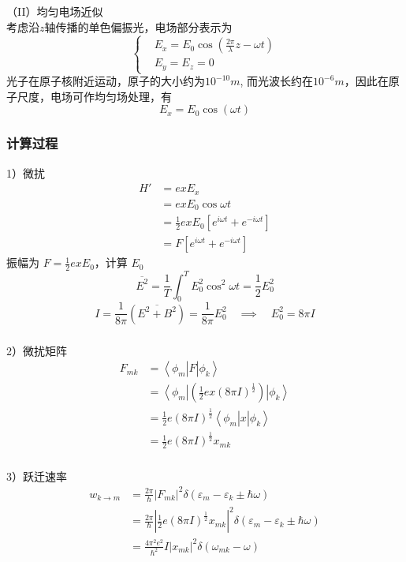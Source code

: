 \begin{frame} 
  \frametitle{}
（II）均匀电场近似 \\ 
考虑沿$z$轴传播的单色偏振光，电场部分表示为
\[ \left\{
  \begin{aligned}
    &E_x =E_0 \cos(\frac{2\pi}{\lambda}z - \omega t) \\ 
    &E_y = E_z =0
  \end{aligned} \right.\]
  光子在原子核附近运动，原子的大小约为$10^{-10} m$, 而光波长约在$10^{-6} m$，因此在原子尺度，电场可作均匀场处理，有
  \[ E_x =E_0 \cos(\omega t)\]
\end{frame} 

\begin{frame} 
  \frametitle{计算过程}
  1）微扰  \\
  \[ 
    \begin{aligned}
      H' &=  exE_x \\ 
      &= exE_0\cos \omega t \\
      &= \frac{1}{2}exE_0[e^{i \omega t} + e^{-i \omega t}] \\
      &= F [e^{i \omega t} + e^{-i \omega t}]
    \end{aligned} \]
    振幅为 $ F = \frac{1}{2}exE_0$，计算 $E_0$
    \[ \overline{E^2} = \frac{1}{T} \int_0^T E^2_0 \cos^2 \omega t =\frac{1}{2} E^2_0\]
    \[I = \frac{1}{8\pi} (\overline{E^2 + B^2}) =  \frac{1}{8\pi} E^2_0 \quad \implies \quad  E^2_0 = 8\pi I\] 
\end{frame} 

\begin{frame} 
  \frametitle{}
  2）微扰矩阵 \\
  \[
  \begin{aligned}
    F_{mk} &=  \left\langle \phi _m  \right\vert F  \left\vert \phi _k   \right\rangle \\ 
    &= \left\langle \phi _m  \right\vert (\frac{1}{2}ex (8\pi I)^\frac{1}{2})  \left\vert \phi _k   \right\rangle\\
    &= \frac{1}{2}e (8\pi I)^\frac{1}{2} \left\langle \phi _m  \right\vert x \left\vert \phi _k   \right\rangle \\
    &= \frac{1}{2}e (8\pi I)^\frac{1}{2} x_{mk}
  \end{aligned}
  \]

\end{frame} 

\begin{frame} 
  \frametitle{}
  3）跃迁速率  \\
\begin{equation*}
  \begin{aligned}
    w_{k\to m} &= \frac{2\pi }{\hbar} \left\vert F_{mk} \right\vert ^2 \delta(\varepsilon _m - \varepsilon _k \pm \hbar \omega) \\
    &= \frac{2\pi }{\hbar} \left\vert \frac{1}{2}e (8\pi I)^\frac{1}{2} x_{mk} \right\vert ^2 \delta(\varepsilon _m - \varepsilon _k \pm \hbar \omega) \\
    &= \frac{4\pi ^2 e^2 }{\hbar^2} I \left\vert x_{mk} \right\vert ^2 \delta( \omega _{mk} - \omega)
  \end{aligned}
\end{equation*}
\end{frame} 

